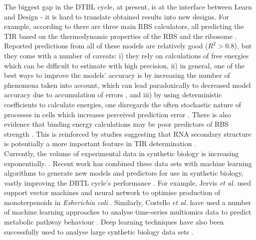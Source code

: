 \documentclass{article}
\begin{document}
The biggest gap in the DTBL cycle, at present, is at the interface between Learn and Design - it is hard to translate obtained results into new designs.
For example, according to  \textcite{Reeve2014} there are three main RBS calculators, all predicting the TIR based on the thermodynamic properties of the RBS and the ribosome \cite{Seo2013,Na2010,Salis2009}. 
Reported predictions from all of these models are relatively good ($R^2 >0.8$), 
but they come with a number of caveats: i) they rely on calculations of free energies which can be difficult to estimate with high precision, ii) in general, one of the best ways to improve the models' accuracy is by increasing the number of phenomena taken into account, which can lead paradoxically to decreased model accuracy due to accumulation of errors \cite{EspahBorujeni2016}, and iii) by using deterministic coefficients to calculate energies, one disregards the often stochastic nature of processes in cells which increases perceived prediction error \cite{Goss1998}. 
There is also evidence that binding energy calculations may be poor predictors of RBS strength \cite{Saito2020,Sherer1980}. This is reinforced by studies suggesting that RNA secondary structure is potentially a more important feature in TIR determination \cite{DESMIT1994,EspahBorujeni2016}.\\

Currently, the volume of experimental data in synthetic biology is increasing exponentially. \cite{Freemont2019}. 
Recent work has combined these data sets with machine learning algorithms to generate new models and predictors for use in synthetic biology, vastly improving the DBTL cycle's performance \cite{Camacho2018,Radivojevic2020,LAWSON2021}. 
For example, Jervis \emph{et al.} used support vector machines and neural network to optimise production of monoterpenoids in \emph{Esherichia coli} \cite{Jervis2019}.
Similarly, Costello \emph{et al.} have used a number of machine learning approaches to analyse time-series multiomics data to predict metabolic pathway behaviour \cite{Costello2018}. Deep learning techniques have also been successfully used to analyse large synthetic biology data sets \cite{Alipanahi2015,Angermueller2016,Hollerer2020}.\\
\end{document}

